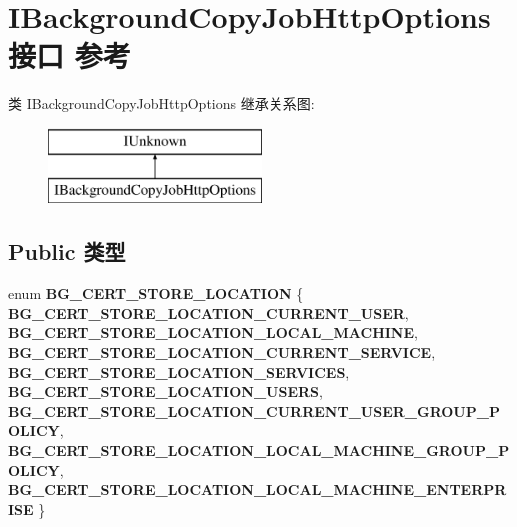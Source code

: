 \hypertarget{interface_i_background_copy_job_http_options}{}\section{I\+Background\+Copy\+Job\+Http\+Options接口 参考}
\label{interface_i_background_copy_job_http_options}
类 I\+Background\+Copy\+Job\+Http\+Options 继承关系图\+:\begin{figure}[H]
\begin{center}
\leavevmode
\includegraphics[height=2.000000cm]{interface_i_background_copy_job_http_options}
\end{center}
\end{figure}
\subsection*{Public 类型}
\begin{DoxyCompactItemize}
\item 
\mbox{\label{interface_i_background_copy_job_http_options_ac2677eccd322206a19d09f5319708ca5}} 
enum {\bfseries B\+G\+\_\+\+C\+E\+R\+T\+\_\+\+S\+T\+O\+R\+E\+\_\+\+L\+O\+C\+A\+T\+I\+ON} \{ \newline
{\bfseries B\+G\+\_\+\+C\+E\+R\+T\+\_\+\+S\+T\+O\+R\+E\+\_\+\+L\+O\+C\+A\+T\+I\+O\+N\+\_\+\+C\+U\+R\+R\+E\+N\+T\+\_\+\+U\+S\+ER}, 
{\bfseries B\+G\+\_\+\+C\+E\+R\+T\+\_\+\+S\+T\+O\+R\+E\+\_\+\+L\+O\+C\+A\+T\+I\+O\+N\+\_\+\+L\+O\+C\+A\+L\+\_\+\+M\+A\+C\+H\+I\+NE}, 
{\bfseries B\+G\+\_\+\+C\+E\+R\+T\+\_\+\+S\+T\+O\+R\+E\+\_\+\+L\+O\+C\+A\+T\+I\+O\+N\+\_\+\+C\+U\+R\+R\+E\+N\+T\+\_\+\+S\+E\+R\+V\+I\+CE}, 
{\bfseries B\+G\+\_\+\+C\+E\+R\+T\+\_\+\+S\+T\+O\+R\+E\+\_\+\+L\+O\+C\+A\+T\+I\+O\+N\+\_\+\+S\+E\+R\+V\+I\+C\+ES}, 
\newline
{\bfseries B\+G\+\_\+\+C\+E\+R\+T\+\_\+\+S\+T\+O\+R\+E\+\_\+\+L\+O\+C\+A\+T\+I\+O\+N\+\_\+\+U\+S\+E\+RS}, 
{\bfseries B\+G\+\_\+\+C\+E\+R\+T\+\_\+\+S\+T\+O\+R\+E\+\_\+\+L\+O\+C\+A\+T\+I\+O\+N\+\_\+\+C\+U\+R\+R\+E\+N\+T\+\_\+\+U\+S\+E\+R\+\_\+\+G\+R\+O\+U\+P\+\_\+\+P\+O\+L\+I\+CY}, 
{\bfseries B\+G\+\_\+\+C\+E\+R\+T\+\_\+\+S\+T\+O\+R\+E\+\_\+\+L\+O\+C\+A\+T\+I\+O\+N\+\_\+\+L\+O\+C\+A\+L\+\_\+\+M\+A\+C\+H\+I\+N\+E\+\_\+\+G\+R\+O\+U\+P\+\_\+\+P\+O\+L\+I\+CY}, 
{\bfseries B\+G\+\_\+\+C\+E\+R\+T\+\_\+\+S\+T\+O\+R\+E\+\_\+\+L\+O\+C\+A\+T\+I\+O\+N\+\_\+\+L\+O\+C\+A\+L\+\_\+\+M\+A\+C\+H\+I\+N\+E\+\_\+\+E\+N\+T\+E\+R\+P\+R\+I\+SE}
 \}
\end{DoxyCompactItemize}
